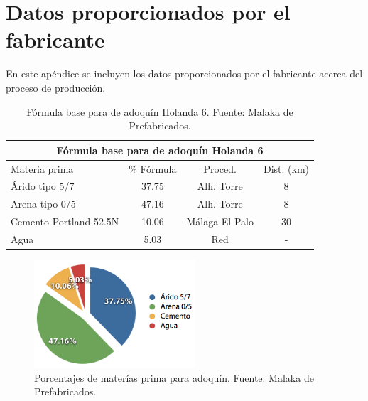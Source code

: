 \chapter{Datos proporcionados por el fabricante}\label{apend:datos}
En este apéndice se incluyen los datos proporcionados por el fabricante acerca del proceso de producción.

\begin{table}[!htb]
\centering
\begin{tabular}{lccc}
\toprule
\multicolumn{4}{c}{Fórmula base para de adoquín Holanda 6}\\
\midrule
Materia prima & \% Fórmula & Proced. & Dist. (\si{km})\\
\midrule
Árido tipo 5/7 & 37.75 & Alh. Torre & 8\\
Arena tipo 0/5 & 47.16 & Alh. Torre & 8\\
Cemento Portland 52.5N & 10.06 & Málaga-El Palo & 30\\
Agua & 5.03 & Red & -\\
\bottomrule
\end{tabular}
\caption[Fórmula base para de adoquín Holanda 6.]{Fórmula base para de adoquín Holanda 6. Fuente: Malaka de Prefabricados.}
\label{formulabase}
\end{table}

\begin{figure}[!htb]
\centering
\includegraphics[width=6cm]{img/porcent_matprima.png}
\caption[Porcentajes de materías prima para adoquín.]{Porcentajes de materías prima para adoquín. Fuente: Malaka de Prefabricados.}
\label{fig:porcentmatprima}
\end{figure}

